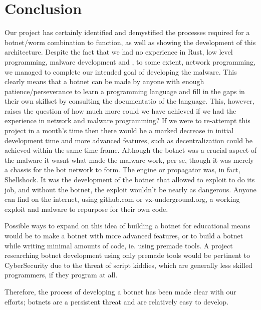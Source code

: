 \documentclass[../main.tex]{subfiles}
\begin{document}
	\chapter*{Conclusion}


Our project has certainly identified and demystified the processes required for a botnet/worm combination to function, as well as showing the development of this architecture. 
Despite the fact that we had no experience in Rust, low level programming, malware development and , to some extent, network programming, we managed to complete our intended goal of developing the malware.
This clearly means that a botnet can be made by anyone with enough patience/perseverance to learn a programming language and fill in the gaps in their own skillset by consulting the documentatio of the language.
This, however, raises the question of how much more could we have achieved if we had the experience in network and malware programming?
If we were to re-attempt this project in a month's time then there would be a marked decrease in initial development time and more advanced features, such as decentralization could be achieved within the same time frame.
Although the botnet was a crucial aspect of the malware it wasnt what made the malware work, per se, though it was merely a chassis for the bot network to form. 
The engine or propagator was, in fact, Shellshock.
It was the development of the botnet that allowed to exploit to do its job, and without the botnet, the exploit wouldn't be nearly as dangerous.
Anyone can find on the internet, using github.com or vx-underground.org, a working exploit and malware to repurpose for their own code.

Possible ways to expand on this idea of building a botnet for educational means would be to make a botnet with more advanced features, or to build a botnet while writing minimal amounts of code, ie. using premade tools.
A project researching botnet development using only premade tools would be pertinent to CyberSecurity due to the threat of script kiddies, which are generally less skilled programmers, if they program at all.

Therefore, the process of developing a botnet has been made clear with our efforts; botnets are a persistent threat and are relatively easy to develop.

	\vspace{10pt}
\end{document}

